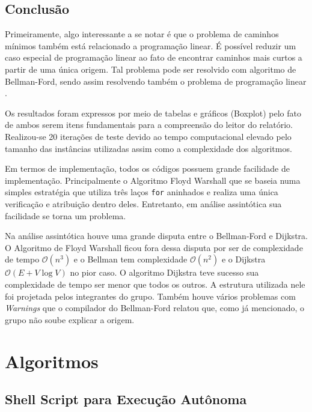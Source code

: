 \documentclass[12pt]{article}
\begin{document}
\subsection{Conclusão}\label{sec:figs}


Primeiramente, algo interessante a se notar é que o problema de caminhos mínimos também está relacionado a programação linear. É possível reduzir um caso especial de programação linear ao fato de encontrar caminhos mais curtos a partir de uma única origem. Tal problema pode ser resolvido com algoritmo de Bellman-Ford, sendo assim resolvendo também o problema de programação linear \cite{cormen2002algoritmos}.

Os resultados foram expressos por meio de tabelas e gráficos (Boxplot) pelo fato de ambos serem itens fundamentais para a compreensão do leitor do relatório. Realizou-se 20 iterações de teste devido ao tempo computacional elevado pelo tamanho das instâncias utilizadas assim como a complexidade dos algoritmos. 

Em termos de implementação, todos os códigos possuem grande facilidade de implementação. Principalmente o Algoritmo Floyd Warshall que se baseia numa simples estratégia que utiliza três laços \texttt{for} aninhados e realiza uma única verificação e atribuição dentro deles. Entretanto, em análise assintótica sua facilidade se torna um problema.

Na análise assintótica houve uma grande disputa entre o Bellman-Ford e Dijkstra. O Algoritmo de Floyd Warshall ficou fora dessa disputa por ser de complexidade de tempo  $\mathcal{O}(n^3)$ e o Bellman tem complexidade  $\mathcal{O}(n^2)$ e o Dijkstra $\mathcal{O}(E + V \log V)$ no pior caso. O algoritmo Dijkstra teve sucesso sua complexidade de tempo ser menor que todos os outros. A estrutura utilizada nele foi projetada pelos integrantes do grupo. Também houve vários problemas com \textit{Warnings} que o compilador do Bellman-Ford relatou que, como já mencionado, o grupo não soube explicar a origem.

\section{Algoritmos}
\subsection{Shell Script para Execução Autônoma}
\end{document}
